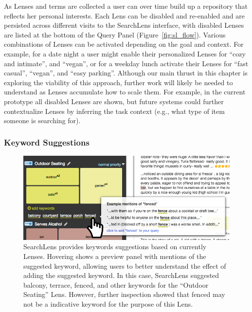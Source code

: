 As Lenses and terms are collected a user can over time build up a repository that reflects her personal interests. Each Lens can be disabled and re-enabled and are persisted across different visits to the SearchLens interface, with disabled Lenses are listed at the bottom of the Query Panel (Figure~\ref{fig:sl_flow}). Various combinations of Lenses can be activated depending on the goal and context. For example, for a date night a user might enable their personalized Lenses for ``cozy and intimate'', and ``vegan'', or for a weekday lunch activate their Lenses for ``fast casual'', ``vegan'', and ``easy parking''. Although our main thrust in this chapter is exploring the viability of this approach, further work will likely be needed to understand as Lenses accumulate how to scale them. For example, in the current prototype all disabled Lenses are shown, but future systems could further contextualize Lenses by inferring the task context (e.g., what type of item someone is searching for). %



\subsubsection{Keyword Suggestions}

\begin{figure}
    \centering
    \includegraphics[width=0.6\columnwidth]{Chapters/SearchLens/figures/suggestions.png}
    \caption[SearchLens provides keywords suggestions based on currently Lenses.]{SearchLens provides keywords suggestions based on currently Lenses. Hovering shows a preview panel with mentions of the suggested keyword, allowing users to better understand the effect of adding the suggested keyword. In this case, SearchLens suggested balcony, terrace, fenced, and other keywords for the ``Outdoor Seating'' Lens. However, further inspection showed that fenced may not be a indicative keyword for the purpose of this Lens.}
    \label{fig:sl_suggestion}
\end{figure}


